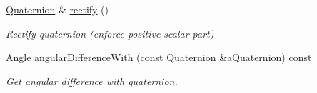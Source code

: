 \begin{DoxyCompactItemize}
\hyperlink{classlibrary_1_1math_1_1geom_1_1d3_1_1trf_1_1rot_1_1_quaternion}{Quaternion} \& \hyperlink{classlibrary_1_1math_1_1geom_1_1d3_1_1trf_1_1rot_1_1_quaternion_aad5bf4f7ab207b0c001680773d81071e}{rectify} ()
\begin{DoxyCompactList}\small\item\em Rectify quaternion (enforce positive scalar part) \end{DoxyCompactList}\item 
\hyperlink{classlibrary_1_1math_1_1geom_1_1_angle}{Angle} \hyperlink{classlibrary_1_1math_1_1geom_1_1d3_1_1trf_1_1rot_1_1_quaternion_a6b75e097378cd268927a0488cf9caf30}{angular\+Difference\+With} (const \hyperlink{classlibrary_1_1math_1_1geom_1_1d3_1_1trf_1_1rot_1_1_quaternion}{Quaternion} \&a\+Quaternion) const
\begin{DoxyCompactList}\small\item\em Get angular difference with quaternion. \end{DoxyCompactList}\end{DoxyCompactItemize}
